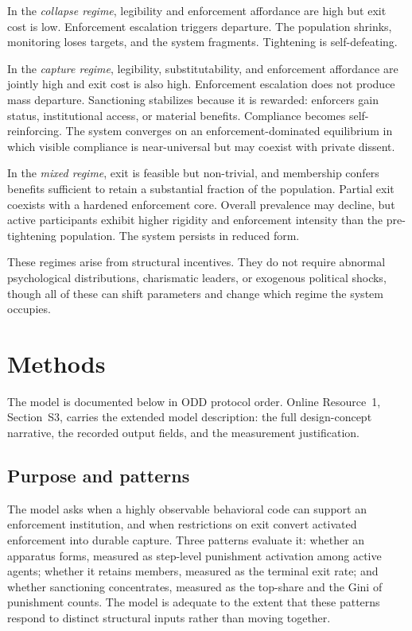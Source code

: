 \documentclass[12pt]{article}
\begin{document}
In the \textit{collapse regime}, legibility and enforcement affordance are high but exit cost is low. Enforcement escalation triggers departure. The population shrinks, monitoring loses targets, and the system fragments. Tightening is self-defeating.

In the \textit{capture regime}, legibility, substitutability, and enforcement affordance are jointly high and exit cost is also high. Enforcement escalation does not produce mass departure. Sanctioning stabilizes because it is rewarded: enforcers gain status, institutional access, or material benefits. Compliance becomes self-reinforcing. The system converges on an enforcement-dominated equilibrium in which visible compliance is near-universal but may coexist with private dissent.

In the \textit{mixed regime}, exit is feasible but non-trivial, and membership confers benefits sufficient to retain a substantial fraction of the population. Partial exit coexists with a hardened enforcement core. Overall prevalence may decline, but active participants exhibit higher rigidity and enforcement intensity than the pre-tightening population. The system persists in reduced form.

These regimes arise from structural incentives. They do not require abnormal psychological distributions, charismatic leaders, or exogenous political shocks, though all of these can shift parameters and change which regime the system occupies.



\section{Methods}

The model is documented below in ODD protocol order. Online Resource~1,
Section~S3, carries the extended model description: the full design-concept
narrative, the recorded output fields, and the measurement justification.

\subsection{Purpose and patterns}

The model asks when a highly observable behavioral code can support an
enforcement institution, and when restrictions on exit convert activated
enforcement into durable capture. Three patterns evaluate it: whether an
apparatus forms, measured as step-level punishment activation among active
agents; whether it retains members, measured as the terminal exit rate; and
whether sanctioning concentrates, measured as the top-share and the Gini of
punishment counts. The model is adequate to the extent that these patterns
respond to distinct structural inputs rather than moving together.
\end{document}
